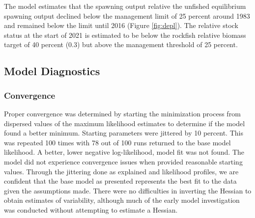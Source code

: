 \documentclass[11pt,
  english,
  a4paper,
]{article}
\begin{document}
\leavevmode\tagmcend\tagstructend\par


The model estimates that the spawning output relative the unfished equilibrium spawning output declined below the management limit of 25 percent around 1983 and remained below the limit until 2016 (Figure \ref{fig:depl}). The relative stock status at the start of 2021 is estimated to be below the rockfish relative biomass target of 40 percent (0.3) but above the management threshold of 25 percent.

\leavevmode\tagmcend\tagstructend\par


\hypertarget{model-diagnostics}{%
\subsection{Model Diagnostics}\label{model-diagnostics}}

\leavevmode\tagmcend\tagstructend


\hypertarget{convergence}{%
\subsubsection{Convergence}\label{convergence}}

\leavevmode\tagmcend\tagstructend


Proper convergence was determined by starting the minimization process from dispersed values of the maximum likelihood estimates to determine if the model found a better minimum. Starting parameters were jittered by 10 percent. This was repeated 100 times with 78 out of 100 runs returned to the base model likelihood. A better, lower negative log-likelihood, model fit was not found. The model did not experience convergence issues when provided reasonable starting values. Through the jittering done as explained and likelihood profiles, we are confident that the base model as presented represents the best fit to the data given the assumptions made. There were no difficulties in inverting the Hessian to obtain estimates of variability, although much of the early model investigation was conducted without attempting to estimate a Hessian.
\end{document}
